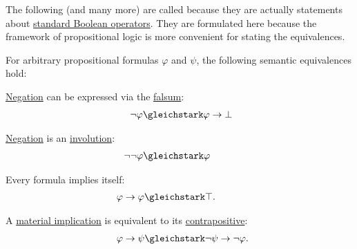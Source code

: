 \begin{proposition}\label{thm:boolean_equivalences}
  The following (and many more) are called  because they are actually statements about \hyperref[def:standard_boolean_operators]{standard Boolean operators}. They are formulated here because the framework of propositional logic is more convenient for stating the equivalences.

  For arbitrary propositional formulas \( \varphi \) and \( \psi \), the following semantic equivalences hold:
  \begin{thmenum}
     \hyperref[def:propositional_language/negation]{Negation} can be expressed via the \hyperref[def:propositional_language/constants/falsum]{falsum}:
    \begin{equation}\label{eq:thm:boolean_equivalences/negation_bottom}
      \begin{split}
        \mathllap{\neg \varphi} &\gleichstark \mathrlap{\varphi \rightarrow \bot}.
      \end{split}
    \end{equation}

     \hyperref[def:propositional_language/negation]{Negation} is an \hyperref[def:involution]{involution}:
    \begin{equation}\label{eq:thm:boolean_equivalences/double_negation}
      \begin{split}
        \mathllap{\neg \neg \varphi} &\gleichstark \mathrlap{\varphi}.
      \end{split}
    \end{equation}

     Every formula implies itself:
    \begin{equation}\label{eq:thm:boolean_equivalences/self_conditional}
      \begin{split}
        \mathllap{\varphi \rightarrow \varphi} &\gleichstark \mathrlap{\top.}
      \end{split}
    \end{equation}

     A \hyperref[def:material_implication]{material implication} is equivalent to its \hyperref[def:material_implication/contrapositive]{contrapositive}:
    \begin{equation}\label{eq:thm:boolean_equivalences/contrapositive}
      \begin{split}
        \mathllap{\varphi \rightarrow \psi} &\gleichstark \mathrlap{\neg \psi \rightarrow \neg \varphi.}
      \end{split}
    \end{equation}


\end{thmenum}
\end{proposition}
